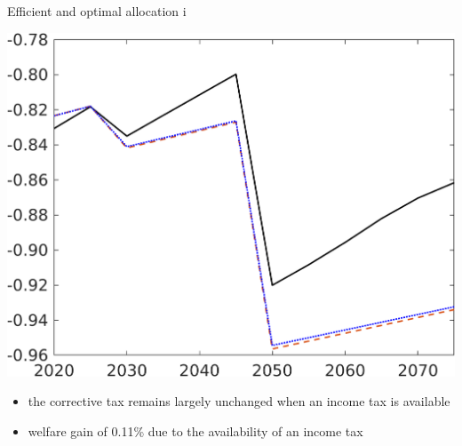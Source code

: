 \documentclass[11pt,aspectratio=169]{beamer}
\begin{document}
\begin{frame}{Efficient and optimal allocation i}
\begin{minipage}[]{0.32\textwidth}
	\includegraphics[width=1\textwidth]{../codding_model/own_basedOnFried/optimalPol_elastS_DisuSci/figures/all_1705/SWF_CompEffOPT_T_NoTaus_spillover0_noskill0_sep1_BN0_ineq0_red0_xgrowth0_zero0_countec0_etaa0.79_lgd0.png}
\end{minipage}

\vspace{6mm}
\begin{itemize}
	\item the corrective tax remains largely unchanged when an income tax is available
	\vspace{2mm}
	\item<2-> welfare gain of 0.11\% due to  the availability of an income tax
\end{itemize}
\end{frame}
\end{document}
